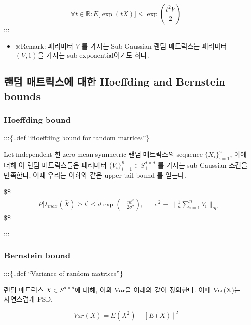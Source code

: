 \documentclass[
]{book}
\providecommand{\tightlist}{%
  \setlength{\itemsep}{0pt}\setlength{\parskip}{0pt}}
\begin{document}
{{{\[
\forall t \in \mathbb R: E \Big [\exp(tX) \Big ] \le \exp \left( \frac{t^2 V}{2} \right)
\]
:::

\begin{itemize}
\tightlist
\item
  ※Remark: 패러미터 \(V\) 를 가지는 Sub-Gaussian 랜덤 매트릭스는 패러미터 \((V , 0)\)을 가지는 sub-exponential이기도 하다.
\end{itemize}

\hypertarget{uxb79cuxb364-uxb9e4uxd2b8uxb9aduxc2a4uxc5d0-uxb300uxd55c-hoeffding-and-bernstein-bounds}{%
\subsection{랜덤 매트릭스에 대한 Hoeffding and Bernstein bounds}\label{uxb79cuxb364-uxb9e4uxd2b8uxb9aduxc2a4uxc5d0-uxb300uxd55c-hoeffding-and-bernstein-bounds}}

\hypertarget{hoeffding-bound}{%
\subsubsection{Hoeffding bound}\label{hoeffding-bound}}

:::\{..def ``Hoeffding bound for random matrices''\}

Let independent 한 zero-mean symmetric 랜덤 매트릭스의 sequence \(\{ X_i \}^n_{i=1}\), 이에 더해 이 랜덤 매트릭스들은 패러미터 \(\{ V_i \}^n_{i=1} \in S_+^{d \times d}\) 를 가지는 sub-Gaussian 조건을 만족한다. 이때 우리는 이하와 같은 upper tail bound 를 얻는다.

\$\$
\begin{align}
&P \Big [ \lambda_{max}(\bar X) \ge t \Big ] \le d \exp \left( - \frac{nt^2}{2\sigma^2}\right), &&\sigma^2 = 

\textstyle

\| \tfrac{1}{n} \sum_{i=1}^n V_i \|_{op}
\end{align}
\$\$

:::

\hypertarget{bernstein-bound}{%
\subsubsection{Bernstein bound}\label{bernstein-bound}}

:::\{..def ``Variance of random matrices''\}

랜덤 매트릭스 \(X \in S^{d \times d}\)에 대해, 이의 Var을 아래와 같이 정의한다. 이때 Var(X)는 자연스럽게 PSD.

\[
Var(X) = E(X^2 ) - \left[ E(X) \right]^2
\]

}}}
\end{document}
